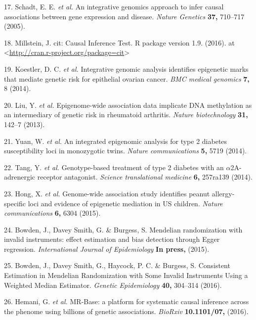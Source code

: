 \documentclass[]{article}
\begin{document}
\hypertarget{ref-Schadt2005}{}
17. Schadt, E. E. \emph{et al.} An integrative genomics approach to
infer causal associations between gene expression and disease.
\emph{Nature Genetics} \textbf{37,} 710--717 (2005).

\hypertarget{ref-Millstein2016}{}
18. Millstein, J. cit: Causal Inference Test. R package version 1.9.
(2016). at
\textless{}\url{http://cran.r-project.org/package=cit}\textgreater{}

\hypertarget{ref-Koestler2014}{}
19. Koestler, D. C. \emph{et al.} Integrative genomic analysis
identifies epigenetic marks that mediate genetic risk for epithelial
ovarian cancer. \emph{BMC medical genomics} \textbf{7,} 8 (2014).

\hypertarget{ref-Liu2013}{}
20. Liu, Y. \emph{et al.} Epigenome-wide association data implicate DNA
methylation as an intermediary of genetic risk in rheumatoid arthritis.
\emph{Nature biotechnology} \textbf{31,} 142--7 (2013).

\hypertarget{ref-Yuan2014}{}
21. Yuan, W. \emph{et al.} An integrated epigenomic analysis for type 2
diabetes susceptibility loci in monozygotic twins. \emph{Nature
communications} \textbf{5,} 5719 (2014).

\hypertarget{ref-Tang2014}{}
22. Tang, Y. \emph{et al.} Genotype-based treatment of type 2 diabetes
with an \(\alpha\)2A-adrenergic receptor antagonist. \emph{Science
translational medicine} \textbf{6,} 257ra139 (2014).

\hypertarget{ref-Hong2015}{}
23. Hong, X. \emph{et al.} Genome-wide association study identifies
peanut allergy-specific loci and evidence of epigenetic mediation in US
children. \emph{Nature communications} \textbf{6,} 6304 (2015).

\hypertarget{ref-Bowden2015}{}
24. Bowden, J., Davey Smith, G. \& Burgess, S. Mendelian randomization
with invalid instruments: effect estimation and bias detection through
Egger regression. \emph{International Journal of Epidemiology}
\textbf{In press,} (2015).

\hypertarget{ref-Bowden2016b}{}
25. Bowden, J., Davey Smith, G., Haycock, P. C. \& Burgess, S.
Consistent Estimation in Mendelian Randomization with Some Invalid
Instruments Using a Weighted Median Estimator. \emph{Genetic
Epidemiology} \textbf{40,} 304--314 (2016).

\hypertarget{ref-Hemani2016}{}
26. Hemani, G. \emph{et al.} MR-Base: a platform for systematic causal
inference across the phenome using billions of genetic associations.
\emph{BioRxiv} \textbf{10.1101/07,} (2016).
\end{document}
